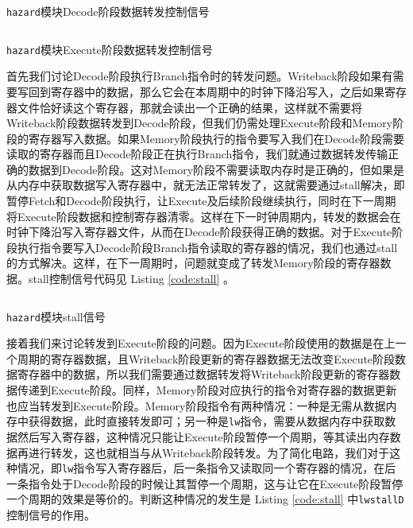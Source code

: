\documentclass[12pt,a4paper]{article}
\newcommand{\incode}[1]{\texttt{#1}} %
\newcommand{\codefile}[1]{\inputminted[bgcolor=bg,linenos,tabsize=4]{verilog}{code/#1}} %
\begin{document}
\begin{listing}[htbp]
	\codefile{forwardD.v}
	\caption{\incode{hazard}模块Decode阶段数据转发控制信号}
	\label{code:forwardD}
\end{listing}

\begin{listing}[htbp]
	\codefile{forwardE.v}
	\caption{\incode{hazard}模块Execute阶段数据转发控制信号}
	\label{code:forwardE}
\end{listing}

首先我们讨论Decode阶段执行Branch指令时的转发问题。Writeback阶段如果有需要写回到寄存器中的数据，那么它会在本周期中的时钟下降沿写入，之后如果寄存器文件恰好读这个寄存器，那就会读出一个正确的结果，这样就不需要将Writeback阶段数据转发到Decode阶段，但我们仍需处理Execute阶段和Memory阶段的寄存器写入数据。如果Memory阶段执行的指令要写入我们在Decode阶段需要读取的寄存器而且Decode阶段正在执行Branch指令，我们就通过数据转发传输正确的数据到Decode阶段。这对Memory阶段不需要读取内存时是正确的，但如果是从内存中获取数据写入寄存器中，就无法正常转发了，这就需要通过stall解决，即暂停Fetch和Decode阶段执行，让Execute及后续阶段继续执行，同时在下一周期将Execute阶段数据和控制寄存器清零。这样在下一时钟周期内，转发的数据会在时钟下降沿写入寄存器文件，从而在Decode阶段获得正确的数据。对于Execute阶段执行指令要写入Decode阶段Branch指令读取的寄存器的情况，我们也通过stall的方式解决。这样，在下一周期时，问题就变成了转发Memory阶段的寄存器数据。stall控制信号代码见 Listing \ref{code:stall} 。

\begin{listing}[htbp]
	\codefile{stall.v}
	\caption{\incode{hazard}模块stall信号}
	\label{code:stall}
\end{listing}

接着我们来讨论转发到Execute阶段的问题。因为Execute阶段使用的数据是在上一个周期的寄存器数据，且Writeback阶段更新的寄存器数据无法改变Execute阶段数据寄存器中的数据，所以我们需要通过数据转发将Writeback阶段更新的寄存器数据传递到Execute阶段。同样，Memory阶段对应执行的指令对寄存器的数据更新也应当转发到Execute阶段。Memory阶段指令有两种情况：一种是无需从数据内存中获得数据，此时直接转发即可；另一种是\incode{lw}指令，需要从数据内存中获取数据然后写入寄存器，这种情况只能让Execute阶段暂停一个周期，等其读出内存数据再进行转发，这也就相当与从Writeback阶段转发。为了简化电路，我们对于这种情况，即\incode{lw}指令写入寄存器后，后一条指令又读取同一个寄存器的情况，在后一条指令处于Decode阶段的时候让其暂停一个周期，这与让它在Execute阶段暂停一个周期的效果是等价的。判断这种情况的发生是 Listing \ref{code:stall} 中\incode{lwstallD}控制信号的作用。
\end{document}

